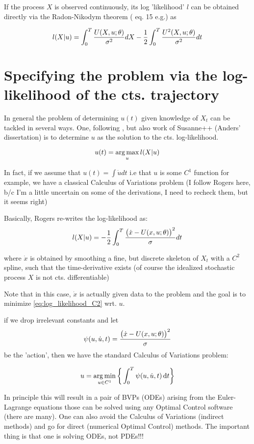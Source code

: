 \documentclass{article}
\begin{document}
If the process $X$ is observed continuously, its log 'likelihood' $l$
can be obtained directly via the Radon-Nikodym theorem (\cite{Phillips2009}
eq. 15 e.g.) as

\begin{equation}
l(X|u) = \int_0^T \frac{U(X,u; {\theta} )}{{\sigma }^2} dX - \frac{1}{2}\int_0^T
\frac{U^2(X,u; {\theta} )}{{\sigma }^2	}dt 
\label{eq:log_likelihood_Girsanov}
\end{equation}
\section{Specifying the problem via the log-likelihood of the cts. trajectory}
In general the problem of determining $u(t)$ given knowledge of $X_t$  
can be tackled in several ways. One, following
\cite{Rogers2013},\cite{Phillips2009} but also work of Susanne++ (Anders'
dissertation) is to determine $u$ as the solution to the cts.
log-likelihood.

$$
u(t) = \argmax_u l(X|u)
$$

In fact, if we assume that $u(t) = \int \dot{u}dt$ i.e that $u$ is some $C^1$
function for example, we have a classical Calculus of Variations problem (I
follow Rogers here, b/c I'm a little uncertain on some of the derivations, I
need to recheck them, but it seems right)  

Basically, Rogers re-writes the log-likelihood as:
\begin{equation}
l(X|u) = - \frac{1}{2} 
\int_0^T \frac{\big( \dot{x} - U(x,u; {\theta} )\big)^2}{{\sigma }}dt
\label{eq:log_likelihood_C2}
\end{equation}

where $\dot{x}$ is obtained by smoothing a fine, but discrete skeleton of $X_t$
with a $C^2$ spline, such that the time-derivative exists (of course the
idealized stochastic process $X$ is not cts. differentiable)

Note that in this case, $\dot{x}$ is actually given data to the problem and the
goal is to minimize \cref{eq:log_likelihood_C2} wrt. $u$.

if we drop irrelevant constants and let 
$$
\psi(u, \dot{u}, t) = \frac{\big( \dot{x} - U(x,u; {\theta} )\big)^2}{{\sigma }}$$ be the
'action', then we have the standard Calculus of Variations problem:

$$
u = \argmin_{u \in C^1} \bigg \{ \int_0^T \psi(u, \dot{u} , t) \intd{t} \bigg\}
$$

In principle this will result in a pair of BVPs (ODEs) arising from the
Euler-Lagrange equations those can be solved using any Optimal Control software
(there are many). One can also avoid the Calculus of Variations (indirect
methods) and go for direct (numerical Optimal Control) methods. The important
thing is that one is solving ODEs, not PDEs!!!
\end{document}
